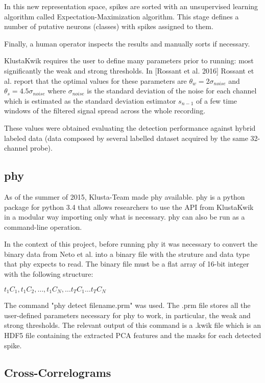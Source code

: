 In this new representation space, spikes are sorted with an unsupervised learning algorithm called Expectation-Maximization algorithm. This stage defines a number of putative neurons (classes) with spikes assigned to them.

Finally, a human operator inspects the results and manually sorts if necessary.

KlustaKwik requires the user to define many parameters prior to running: most significantly the  weak and strong thresholds. In [Rossant et al. 2016] Rossant et al. report that the optimal values for these parameters are $\theta_w = 2 \sigma_{noise}$ and $\theta_s = 4.5 \sigma_{noise}$ where $\sigma_{noise}$ is the standard deviation of the noise for each channel which is estimated as the standard deviation estimator $s_{n-1}$ of a few time windows of the filtered signal spread across the whole recording.

These values were obtained evaluating the detection performance against hybrid labeled data (data composed by several labelled dataset acquired by the same 32-channel probe). 

\subsection{phy}
\label{subsec:phy}
As of the summer of 2015, Klusta-Team made phy available. phy is a python package for python 3.4 that allows researchers to use the API from KlustaKwik in a modular way importing only what is necessary. phy can also be run as a command-line operation.

In the context of this project, before running phy it was necessary to convert the binary data from Neto et al. into a binary file with the struture and data type that phy expects to read. The binary file must be a flat array of 16-bit integer with the following structure:

$t_1C_1 , t_1C_2, \ldots , t_1C_N, \ldots t_TC_1 \ldots t_TC_N$ %

The command "phy detect filename.prm" was used. The .prm file stores all the user-defined parameters necessary for phy to work, in particular, the weak and strong thresholds. The relevant output of this command is a .kwik file which is an HDF5 file containing the extracted PCA features and the masks for each detected spike.

\subsection{Cross-Correlograms}
\label{subsec:CC}

